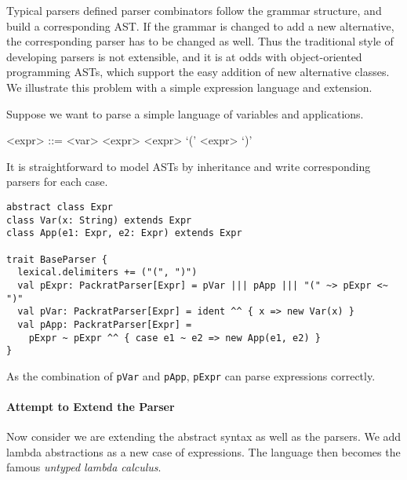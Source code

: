 
Typical parsers defined parser combinators follow the grammar
structure, and build a corresponding AST. If the grammar is changed to
add a new alternative, the corresponding parser has to be changed as
well. Thus the traditional style of developing parsers is not
extensible, and it is at odds with object-oriented programming ASTs,
which support the easy addition of new alternative classes. We
illustrate this problem with a simple expression language and extension.

Suppose we want to parse a simple language of variables and
applications.

\setlength{\grammarindent}{5em}
\begin{grammar}
<expr> ::= <var>
    \alt <expr> <expr>
    \alt `(' <expr> `)'
\end{grammar}

It is straightforward to model ASTs by inheritance and write corresponding parsers for each case.

\begin{lstlisting}
abstract class Expr
class Var(x: String) extends Expr
class App(e1: Expr, e2: Expr) extends Expr

trait BaseParser {
  lexical.delimiters += ("(", ")")
  val pExpr: PackratParser[Expr] = pVar ||| pApp ||| "(" ~> pExpr <~ ")"
  val pVar: PackratParser[Expr] = ident ^^ { x => new Var(x) }
  val pApp: PackratParser[Expr] =
    pExpr ~ pExpr ^^ { case e1 ~ e2 => new App(e1, e2) }
}
\end{lstlisting}

As the combination of \lstinline{pVar} and \lstinline{pApp}, \lstinline{pExpr} can parse expressions correctly.

\paragraph{Attempt to Extend the Parser} Now consider we are extending the abstract syntax as well as the parsers. We add lambda abstractions as a new case of expressions. The language then becomes the famous \textit{untyped lambda calculus}.

